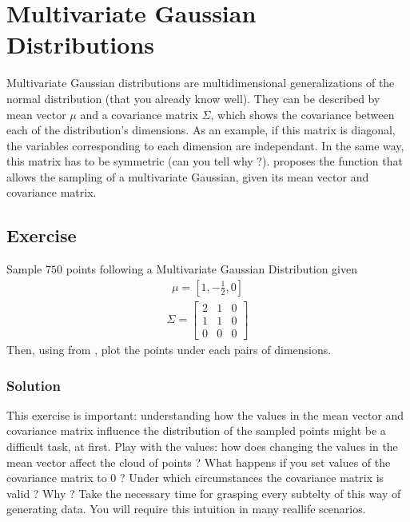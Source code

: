 \documentclass[letterpaper,10pt,english]{jupyterBook}
\begin{document}
\section{Multivariate Gaussian Distributions}
\label{\detokenize{01:multivariate-gaussian-distributions}}
\sphinxAtStartPar
Multivariate Gaussian distributions are multidimensional generalizations of the normal distribution (that you already know well).
They can be described by mean vector \(\mu\) and a covariance matrix \(\Sigma\), which shows the covariance between each of the distribution’s dimensions. As an example, if this matrix is diagonal, the variables corresponding to each dimension are independant. In the same way, this matrix has to be symmetric (can you tell why ?).  proposes the function  that allows the sampling of a multivariate Gaussian, given its mean vector and covariance matrix.


\subsection{Exercise}
\label{\detokenize{01:exercise}}
\sphinxAtStartPar
Sample \(750\) points following a Multivariate Gaussian Distribution given
\begin{equation*}
\begin{split}\mu = [1, -\frac12, 0]\end{split}
\end{equation*}\begin{equation*}
\begin{split}\Sigma =  \begin{bmatrix}2&1&0\\1&1&0\\0&0&0\end{bmatrix}\end{split}
\end{equation*}
\sphinxAtStartPar
Then, using  from , plot the points under each pairs of dimensions.


\subsubsection{Solution}
\label{\detokenize{01:id1}}
\begin{sphinxShadowBox}
\sphinxstylesidebartitle{}

\sphinxAtStartPar
This exercise is important: understanding how the values in the mean vector and covariance matrix influence the distribution of the sampled points might be a difficult task, at first. Play with the values: how does changing the values in the mean vector affect the cloud of points ? What happens if you set values of the covariance matrix to \(0\) ? Under which circumstances the covariance matrix is valid ? Why ? Take the necessary time for grasping every subtelty of this way of generating data. You will require this intuition in many real\sphinxhyphen{}life scenarios.
\end{sphinxShadowBox}
\end{document}

